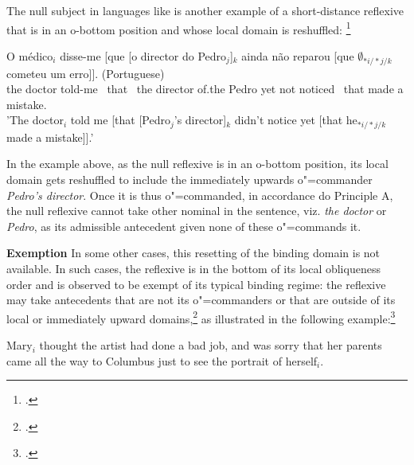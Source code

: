 \documentclass[output=paper
,modfonts
,nonflat]{langsci/langscibook}
\begin{document}
The null subject in languages like  is another example of a short-distance 
reflexive that is in an o-bottom position and whose local domain is reshuffled:%
\footnote{
\citep{brancoNullSubject:2007}.
}

\begin{exe}
\ex
		\gll O m\'{e}dico$_{i}$ disse-me [que [o director do Pedro$_{j}$]$_{k}$ ainda n\~{a}o reparou [que $\emptyset_{*i/*j/k}$ cometeu um erro]]. (Portuguese)\\
		the doctor told-me \mbox{ }that \mbox{ }the director of.the Pedro yet not noticed \mbox{ }that { } made a mistake.\\
		\trans 'The doctor$_{i}$ told me [that [Pedro$_{j}$'s director]$_{k}$ didn't notice yet [that he$_{*i/*j/k}$ made a mistake]].'

\end{exe}

In the example above, as the null reflexive is in an o-bottom position, its local domain gets reshuffled to include the immediately
upwards o"=commander {\em Pedro's director}. Once it is thus o"=commanded, in accordance do Principle A, the null reflexive cannot take other nominal in the sentence,
viz. {\em the doctor} or {\em Pedro}, as its admissible antecedent given none of these o"=commands it.

%


\textbf{Exemption} In some other cases, this resetting of the binding domain is not 
available. In such cases, the reflexive is in the bottom of its local obliqueness
order and is observed to be exempt of its typical binding regime: the reflexive may take antecedents 
that are not its o"=commanders or that are
outside of its local or immediately upward domains,\footnote{
\citep[]{polsag:hpsg94}.}
as illustrated in the following example:\footnote{
\citep[]{golde:diss99}.
}


\begin{exe}
\ex Mary$_{i}$ thought the artist had done a bad job, and was sorry
that her parents
came all the way to Columbus just to see the portrait of herself$_{i}$.
\end{exe}
\end{document}
